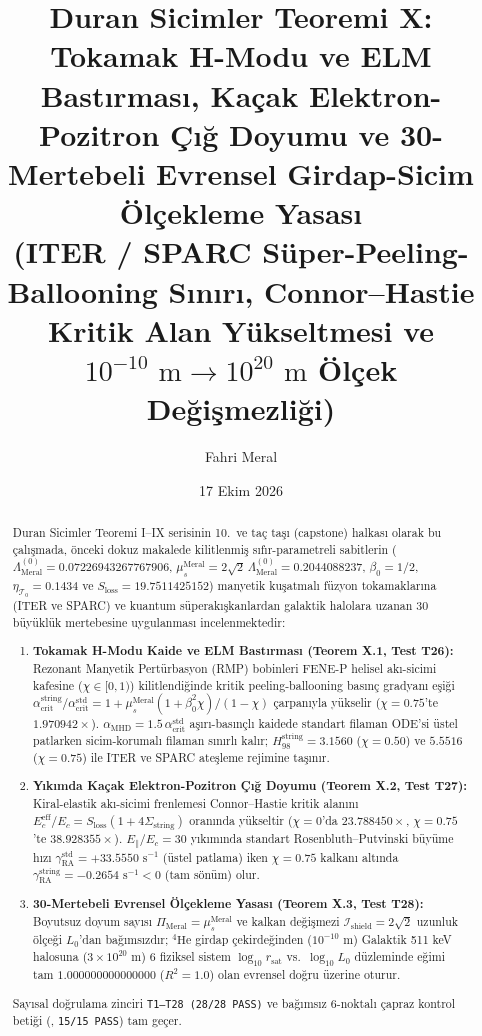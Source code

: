 \documentclass[12pt,a4paper]{article}
\title{\textbf{Duran Sicimler Teoremi X: Tokamak H-Modu ve ELM Bastırması, Kaçak Elektron-Pozitron Çığ Doyumu ve 30-Mertebeli Evrensel Girdap-Sicim Ölçekleme Yasası} \\[0.3cm]
\large (ITER / SPARC Süper-Peeling-Ballooning Sınırı, Connor--Hastie Kritik Alan Yükseltmesi ve $10^{-10}\text{ m}\to 10^{20}\text{ m}$ Ölçek Değişmezliği)}
\author{Fahri Meral}
\date{17 Ekim 2026}
\begin{document}
\shorthandoff{=}

\maketitle

\begin{abstract}
Duran Sicimler Teoremi I--IX serisinin 10.\ ve taç taşı (capstone) halkası olarak bu çalışmada, önceki dokuz makalede kilitlenmiş sıfır-parametreli sabitlerin ($\Lambda_{\mathrm{Meral}}^{(0)} = 0.07226943267767906$, $\mu_s^{\mathrm{Meral}} = 2\sqrt{2}\,\Lambda_{\mathrm{Meral}}^{(0)} = 0.2044088237$, $\beta_0 = 1/2$, $\eta_{\mathcal{T}_0} = 0.1434$ ve $S_{\mathrm{loss}} = 19.7511425152$) manyetik kuşatmalı füzyon tokamaklarına (ITER ve SPARC) ve kuantum süperakışkanlardan galaktik halolara uzanan 30 büyüklük mertebesine uygulanması incelenmektedir:
\begin{enumerate}
    \item \textbf{Tokamak H-Modu Kaide ve ELM Bastırması (Teorem X.1, Test T26):} Rezonant Manyetik Pertürbasyon (RMP) bobinleri FENE-P helisel akı-sicimi kafesine ($\chi\in[0,1)$) kilitlendiğinde kritik peeling-ballooning basınç gradyanı eşiği $\alpha_{\mathrm{crit}}^{\mathrm{string}}/\alpha_{\mathrm{crit}}^{\mathrm{std}} = 1 + \mu_s^{\mathrm{Meral}}(1+\beta_0^2\chi)/(1-\chi)$ çarpanıyla yükselir ($\chi=0.75$'te $1.970942\times$). $\alpha_{\mathrm{MHD}} = 1.5\,\alpha_{\mathrm{crit}}^{\mathrm{std}}$ aşırı-basınçlı kaidede standart filaman ODE'si üstel patlarken sicim-korumalı filaman sınırlı kalır; $H_{98}^{\mathrm{string}} = 3.1560$ ($\chi=0.50$) ve $5.5516$ ($\chi=0.75$) ile ITER ve SPARC ateşleme rejimine taşınır.
    \item \textbf{Yıkımda Kaçak Elektron-Pozitron Çığ Doyumu (Teorem X.2, Test T27):} Kiral-elastik akı-sicimi frenlemesi Connor--Hastie kritik alanını $E_c^{\mathrm{eff}}/E_c = S_{\mathrm{loss}}(1+4\Sigma_{\mathrm{string}})$ oranında yükseltir ($\chi=0$'da $23.788450\times$, $\chi=0.75$'te $38.928355\times$). $E_\parallel/E_c = 30$ yıkımında standart Rosenbluth--Putvinski büyüme hızı $\gamma_{\mathrm{RA}}^{\mathrm{std}} = +33.5550\text{ s}^{-1}$ (üstel patlama) iken $\chi=0.75$ kalkanı altında $\gamma_{\mathrm{RA}}^{\mathrm{string}} = -0.2654\text{ s}^{-1} < 0$ (tam sönüm) olur.
    \item \textbf{30-Mertebeli Evrensel Ölçekleme Yasası (Teorem X.3, Test T28):} Boyutsuz doyum sayısı $\Pi_{\mathrm{Meral}} = \mu_s^{\mathrm{Meral}}$ ve kalkan değişmezi $\mathcal{I}_{\mathrm{shield}} = 2\sqrt{2}$ uzunluk ölçeği $L_0$'dan bağımsızdır; $^4\mathrm{He}$ girdap çekirdeğinden ($10^{-10}\text{ m}$) Galaktik 511 keV halosuna ($3\times 10^{20}\text{ m}$) 6 fiziksel sistem $\log_{10} r_{\mathrm{sat}}$ vs.\ $\log_{10} L_0$ düzleminde eğimi tam $1.000000000000000$ ($R^2 = 1.0$) olan evrensel doğru üzerine oturur.
\end{enumerate}
Sayısal doğrulama zinciri \texttt{T1--T28 (28/28 PASS)} ve bağımsız 6-noktalı çapraz kontrol betiği (, \texttt{15/15 PASS}) tam geçer.
\end{abstract}
\end{document}
